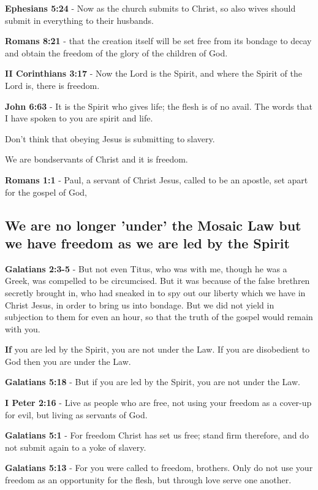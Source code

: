 \documentclass[11pt]{article}
\begin{document}
\textbf{Ephesians 5:24} - Now as the church submits to Christ, so also wives should submit in everything to their husbands.

\textbf{Romans 8:21} - that the creation itself will be set free from its bondage to decay and obtain the freedom of the glory of the children of God.

\textbf{II Corinthians 3:17} - Now the Lord is the Spirit, and where the Spirit of the Lord is, there is freedom.

\textbf{John 6:63} - It is the Spirit who gives life; the flesh is of no avail. The words that I have spoken to you are spirit and life.

Don't think that obeying Jesus is submitting to slavery.

We are bondservants of Christ and it is freedom.

\textbf{Romans 1:1} - Paul, a servant of Christ Jesus, called to be an apostle, set apart for the gospel of God,

\subsection{We are no longer 'under' the Mosaic Law but we have freedom as we are led by the Spirit}
\label{sec:org248c2f0}

\textbf{Galatians 2:3-5} - But not even Titus, who was with me, though he was a Greek, was compelled to be circumcised. But it was because of the false brethren secretly brought in, who had sneaked in to spy out our liberty which we have in Christ Jesus, in order to bring us into bondage. But we did not yield in subjection to them for even an hour, so that the truth of the gospel would remain with you.

\textbf{If} you are led by the Spirit, you are not under the Law.
If you are disobedient to God then you are under the Law.

\textbf{Galatians 5:18} - But if you are led by the Spirit, you are not under the Law.

\textbf{I Peter 2:16} - Live as people who are free, not using your freedom as a cover-up for evil, but living as servants of God.

\textbf{Galatians 5:1} - For freedom Christ has set us free; stand firm therefore, and do not submit again to a yoke of slavery.

\textbf{Galatians 5:13} - For you were called to freedom, brothers. Only do not use your freedom as an opportunity for the flesh, but through love serve one another.
\end{document}
